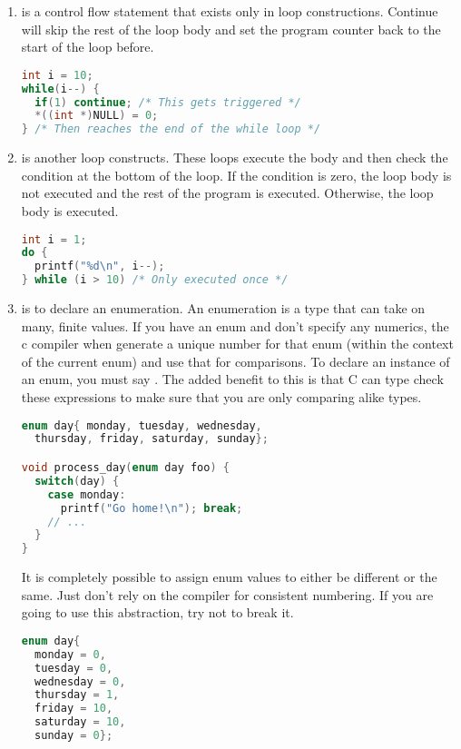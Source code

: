 \begin{enumerate}
	\item {} is a control flow statement that exists only in loop constructions. Continue will skip the rest of the loop body and set the program counter back to the start of the loop before.

	      \begin{lstlisting}[language=C]
int i = 10;
while(i--) {
  if(1) continue; /* This gets triggered */
  *((int *)NULL) = 0;
} /* Then reaches the end of the while loop */
\end{lstlisting}

	\item {} is another loop constructs. These loops execute the body and then check the condition at the bottom of the loop. If the condition is zero, the loop body is not executed and the rest of the program is executed. Otherwise, the loop body is executed.

	      \begin{lstlisting}[language=C]
int i = 1;
do {
  printf("%d\n", i--);
} while (i > 10) /* Only executed once */
\end{lstlisting}

	\item {} is to declare an enumeration. An enumeration is a type that can take on many, finite values. If you have an enum and don't specify any numerics, the c compiler when generate a unique number for that enum (within the context of the current enum) and use that for comparisons. To declare an instance of an enum, you must say . The added benefit to this is that C can type check these expressions to make sure that you are only comparing alike types.

	      \begin{lstlisting}[language=C]
enum day{ monday, tuesday, wednesday,
  thursday, friday, saturday, sunday};

void process_day(enum day foo) {
  switch(day) {
    case monday:
      printf("Go home!\n"); break;
    // ...
  }
}
\end{lstlisting}

	      It is completely possible to assign enum values to either be different or the same. Just don't rely on the compiler for consistent numbering. If you are going to use this abstraction, try not to break it.

	      \begin{lstlisting}[language=C]
enum day{ 
  monday = 0, 
  tuesday = 0, 
  wednesday = 0,
  thursday = 1, 
  friday = 10, 
  saturday = 10, 
  sunday = 0};


\end{lstlisting}
\end{enumerate}
